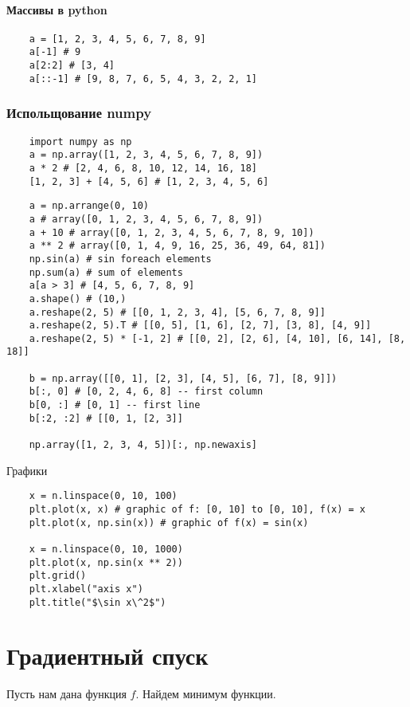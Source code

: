 \paragraph{Массивы в python}
\begin{lstlisting}
    a = [1, 2, 3, 4, 5, 6, 7, 8, 9]
    a[-1] # 9
    a[2:2] # [3, 4]
    a[::-1] # [9, 8, 7, 6, 5, 4, 3, 2, 2, 1]
\end{lstlisting}

\subsubsection{Испольщование numpy}
\begin{lstlisting}
    import numpy as np
    a = np.array([1, 2, 3, 4, 5, 6, 7, 8, 9])
    a * 2 # [2, 4, 6, 8, 10, 12, 14, 16, 18]
    [1, 2, 3] + [4, 5, 6] # [1, 2, 3, 4, 5, 6]
\end{lstlisting}

\begin{lstlisting}
    a = np.arrange(0, 10)
    a # array([0, 1, 2, 3, 4, 5, 6, 7, 8, 9])
    a + 10 # array([0, 1, 2, 3, 4, 5, 6, 7, 8, 9, 10])
    a ** 2 # array([0, 1, 4, 9, 16, 25, 36, 49, 64, 81])
    np.sin(a) # sin foreach elements
    np.sum(a) # sum of elements
    a[a > 3] # [4, 5, 6, 7, 8, 9]
    a.shape() # (10,)
    a.reshape(2, 5) # [[0, 1, 2, 3, 4], [5, 6, 7, 8, 9]]
    a.reshape(2, 5).T # [[0, 5], [1, 6], [2, 7], [3, 8], [4, 9]]
    a.reshape(2, 5) * [-1, 2] # [[0, 2], [2, 6], [4, 10], [6, 14], [8, 18]]

    b = np.array([[0, 1], [2, 3], [4, 5], [6, 7], [8, 9]])
    b[:, 0] # [0, 2, 4, 6, 8] -- first column
    b[0, :] # [0, 1] -- first line
    b[:2, :2] # [[0, 1, [2, 3]]

    np.array([1, 2, 3, 4, 5])[:, np.newaxis]
\end{lstlisting}

Графики
\begin{lstlisting}
    x = n.linspace(0, 10, 100)
    plt.plot(x, x) # graphic of f: [0, 10] to [0, 10], f(x) = x
    plt.plot(x, np.sin(x)) # graphic of f(x) = sin(x)

    x = n.linspace(0, 10, 1000)
    plt.plot(x, np.sin(x ** 2))
    plt.grid()
    plt.xlabel("axis x")
    plt.title("$\sin x\^2$")
\end{lstlisting}


\section{Градиентный спуск}
Пусть нам дана функция $f$. Найдем минимум функции.

